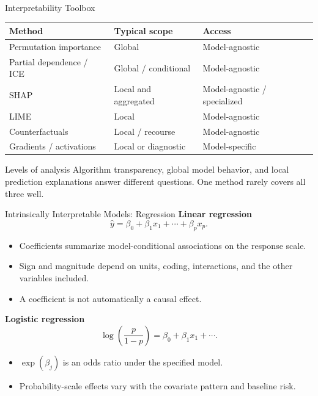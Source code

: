 \begin{frame}{Interpretability Toolbox}
\begin{table}
\small
\begin{tabular}{lll}
\toprule
\textbf{Method} & \textbf{Typical scope} & \textbf{Access} \\
\midrule
Permutation importance & Global & Model-agnostic \\
Partial dependence / ICE & Global / conditional & Model-agnostic \\
SHAP & Local and aggregated & Model-agnostic / specialized \\
LIME & Local & Model-agnostic \\
Counterfactuals & Local / recourse & Model-agnostic \\
Gradients / activations & Local or diagnostic & Model-specific \\
\bottomrule
\end{tabular}
\end{table}

\begin{block}{Levels of analysis}
Algorithm transparency, global model behavior, and local prediction explanations answer different questions. One method rarely covers all three well.
\end{block}
\end{frame}


\begin{frame}{Intrinsically Interpretable Models: Regression}
\textbf{Linear regression}
\[
  \hat{y}=\beta_0+\beta_1x_1+\cdots+\beta_px_p.
\]

\begin{itemize}
  \item Coefficients summarize model-conditional associations on the response scale.
  \item Sign and magnitude depend on units, coding, interactions, and the other variables included.
  \item A coefficient is not automatically a causal effect.
\end{itemize}

\textbf{Logistic regression}
\[
  \log\left(\frac{p}{1-p}\right)=\beta_0+\beta_1x_1+\cdots.
\]

\begin{itemize}
  \item $\exp(\beta_j)$ is an odds ratio under the specified model.
  \item Probability-scale effects vary with the covariate pattern and baseline risk.
\end{itemize}
\end{frame}

